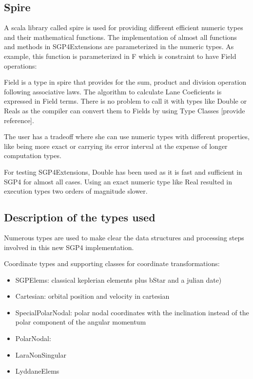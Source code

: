 \documentclass{article}
\begin{document}
\subsection{Spire}
\label{sec:spire}

A scala library called spire is used for providing different efficient numeric types
and their mathematical functions.
The implementation of almost all functions and methods in SGP4Extensions
are parameterized in the numeric types. As example, this function is parameterized
in F which is constraint to have Field operations:

Field is a type in spire that provides for the sum, product and division operation
following associative laws. The algorithm to calculate Lane Coeficients is expressed in Field terms.
There is no problem to call it with types like Double or Reals as the compiler can
convert them to Fields by using Type Classes [provide reference].

The user has a tradeoff where she can use numeric types with different properties,
like being more exact or carrying its error interval
at the expense of longer computation types.

For testing SGP4Extensions, Double has been used as it is fast and sufficient in SGP4 for almost all cases.
Using an exact numeric type like Real resulted in execution types two orders of magnitude slower.


\subsection{Description of the types used}
\label{sec:typesystem}

Numerous types are used to make clear the data structures and processing
steps involved in this new SGP4 implementation.

Coordinate types and supporting classes for coordinate transformations:
\begin{itemize}
\item SGPElems: classical keplerian elements plus bStar and a julian date)
\item Cartesian: orbital position and velocity in cartesian
\item SpecialPolarNodal: polar nodal coordinates with the inclination instead of the polar component of the angular momentum
\item PolarNodal: \cite{}
\item LaraNonSingular
\item LyddaneElems
\end{itemize}
\end{document}
